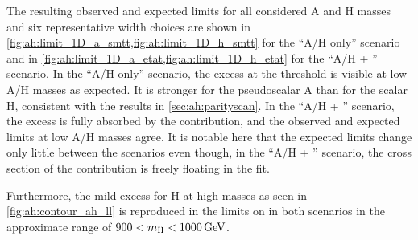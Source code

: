 The resulting observed and expected limits for all considered A and H masses and six representative width choices are shown in \cref{fig:ah:limit_1D_a_smtt,fig:ah:limit_1D_h_smtt} for the ``A/H only'' scenario and in \cref{fig:ah:limit_1D_a_etat,fig:ah:limit_1D_h_etat} for the ``A/H + \etat'' scenario. In the ``A/H only'' scenario, the excess at the \ttbar threshold is visible at low A/H masses as expected. It is stronger for the pseudoscalar A than for the scalar H, consistent with the results in \cref{sec:ah:parityscan}. In the ``A/H + \etat'' scenario, the excess is fully absorbed by the \etat contribution, and the observed and expected limits at low A/H masses agree. It is notable here that the expected limits change only little between the scenarios even though, in the ``A/H + \etat'' scenario, the cross section of the \etat contribution is freely floating in the fit. 

Furthermore, the mild excess for H at high masses as seen in \cref{fig:ah:contour_ah_ll} is reproduced in the limits on \gHtt in both scenarios in the approximate range of $900 < \mH < \SI{1000}{\GeV}$.

